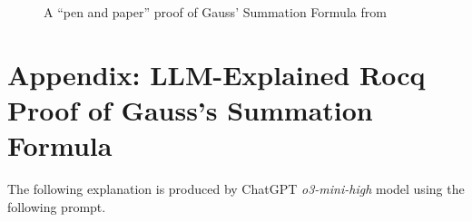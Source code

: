 \documentclass[10pt,nonacm,natbib=false]{acmart}
\begin{document}
\begin{figure}[h]
  \caption{A ``pen and paper'' proof of Gauss' Summation Formula from \cite{roberts2014introduction}}
\end{figure}
  
\newpage
\section{Appendix: LLM-Explained Rocq Proof of Gauss's Summation Formula}
\label{sec:explained}

The following explanation is produced by ChatGPT \textit{o3-mini-high}
model using the following prompt.
\end{document}
